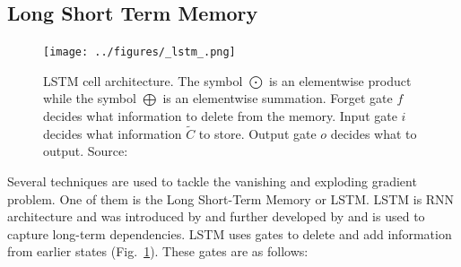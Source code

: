 \documentclass[sigconf, nonacm, natbib, screen, balance=False]{acmart}
\begin{document}
\subsection{Long Short Term Memory}
\begin{figure}
  \centering
  \texttt{[image: ../figures/\_lstm\_.png]}
  \caption{ LSTM cell architecture. The symbol $\bigodot$ is an elementwise product while the symbol $\bigoplus$ is an elementwise summation. Forget gate $f$ decides what information to delete from the memory. Input gate $i$ decides what information $\tilde{C}$ to store. Output gate $o$ decides what to output. Source: \citep{raschka2019python}}
  \label{fig:lstm_difinition}
\end{figure}
Several techniques are used to tackle the vanishing and exploding gradient problem. One of them is the Long Short-Term Memory or LSTM. LSTM is RNN architecture and was introduced by \citep{HochSchm97} and further developed by \citep{Gers1999LearningTF} and is used to capture long-term dependencies. LSTM uses gates to delete and add information from earlier states (Fig.~\ref{fig:lstm_difinition}). These gates are as follows:  
\end{document}
